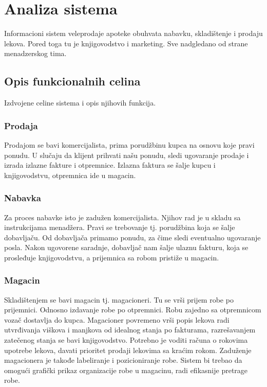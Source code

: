 
\section{Analiza sistema}

Informacioni sistem veleprodaje apoteke obuhvata nabavku, skladištenje i prodaju lekova. Pored toga tu je knjigovodstvo i marketing. Sve nadgledano od strane menadzerskog tima.

\subsection{Opis funkcionalnih celina}
Izdvojene celine sistema i opis njihovih funkcija.

\subsubsection{Prodaja}
Prodajom se bavi komercijalista, prima porudžbinu kupca na osnovu koje pravi ponudu. U slučaju da klijent prihvati našu ponudu, sledi ugovaranje prodaje i izrada izlazne fakture i otpremnice. Izlazna faktura se šalje kupcu i knjigovodstvu, otpremnica ide u magacin. 

\subsubsection{Nabavka}
Za proces nabavke isto je zadužen komercijalista. Njihov rad je u skladu sa instrukcijama menadžera. Pravi se trebovanje tj. porudžbina koja se šalje dobavljaču. Od dobavljača primamo ponudu, za čime sledi eventualno ugovaranje posla. Nakon ugovorene saradnje, dobavljač nam šalje ulaznu fakturu, koja se prosleđuje knjigovodstvu, a prijemnica sa robom pristiže u magacin.

\subsubsection{Magacin}
Skladištenjem se bavi magacin tj. magacioneri. Tu se vrši prijem robe po prijemnici. Odnosno izdavanje robe po otpremnici. Robu zajedno sa otpremnicom vozač dostavlja do kupca. Magacioner povremeno vrši popis lekova radi utvrđivanja viškova i manjkova od idealnog stanja po fakturama, razrešavanjem zatečenog stanja se bavi knjigovodstvo.  Potrebno je voditi računa o rokovima upotrebe lekova, davati prioritet  prodaji lekovima sa kraćim rokom. Zaduženje magacionera je takođe labeliranje i pozicioniranje robe. Sistem bi trebao da omogući grafički prikaz organizacije robe u magacinu, radi efikasnije pretrage robe.

